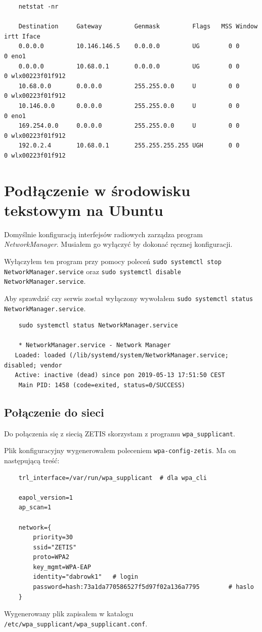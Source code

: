 \documentclass{article} %
\begin{document}
\begin{lstlisting}
    netstat -nr

    Destination     Gateway         Genmask         Flags   MSS Window  irtt Iface
    0.0.0.0         10.146.146.5    0.0.0.0         UG        0 0          0 eno1
    0.0.0.0         10.68.0.1       0.0.0.0         UG        0 0          0 wlx00223f01f912
    10.68.0.0       0.0.0.0         255.255.0.0     U         0 0          0 wlx00223f01f912
    10.146.0.0      0.0.0.0         255.255.0.0     U         0 0          0 eno1
    169.254.0.0     0.0.0.0         255.255.0.0     U         0 0          0 wlx00223f01f912
    192.0.2.4       10.68.0.1       255.255.255.255 UGH       0 0          0 wlx00223f01f912
\end{lstlisting}

\section{Podłączenie w środowisku tekstowym na Ubuntu}
Domyślnie konfiguracją interfejsów radiowych zarządza program \textit{NetworkManager}. Musiałem go wyłączyć by dokonać ręcznej konfiguracji.

Wyłączyłem ten program przy pomocy poleceń \texttt{sudo systemctl stop NetworkManager.service} oraz \texttt{sudo systemctl disable NetworkManager.service}.

Aby sprawdzić czy serwis został wyłączony wywołałem \texttt{sudo systemctl status NetworkManager.service}.
\begin{lstlisting}
    sudo systemctl status NetworkManager.service

    * NetworkManager.service - Network Manager
   Loaded: loaded (/lib/systemd/system/NetworkManager.service; disabled; vendor
   Active: inactive (dead) since pon 2019-05-13 17:51:50 CEST
    Main PID: 1458 (code=exited, status=0/SUCCESS)
\end{lstlisting}
\vspace{5 mm}

\subsection{Połączenie do sieci} \label{sub:wpaUbuntu}
Do połączenia się z siecią ZETIS skorzystam z programu \texttt{wpa\_supplicant}.

Plik konfiguracyjny wygenerowałem poleceniem \texttt{wpa-config-zetis}. Ma on następującą treść:
\begin{lstlisting}
    trl_interface=/var/run/wpa_supplicant  # dla wpa_cli

    eapol_version=1
    ap_scan=1

    network={
        priority=30
        ssid="ZETIS"
        proto=WPA2
        key_mgmt=WPA-EAP  
        identity="dabrowk1"   # login
        password=hash:73a1da770586527f5d97f02a136a7795        # haslo 
    }
\end{lstlisting}
Wygenerowany plik zapisałem w katalogu \texttt{/etc/wpa\_supplicant/wpa\_supplicant.conf}.
\end{document}
